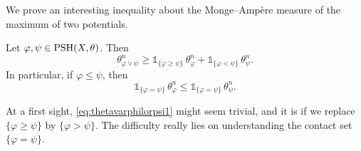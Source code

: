 We prove an interesting inequality about the Monge--Ampère measure of the maximum of two potentials.
\begin{lemma}\label{lma:lorMAineqe}
    Let $\varphi,\psi\in \mathrm{PSH}(X,\theta)$. Then
    \begin{equation}\label{eq:thetavarphilorpsi1}
    \theta_{\varphi\lor \psi}^n\geq \mathds{1}_{\{\varphi\geq \psi\}}\,\theta_{\varphi}^n+\mathds{1}_{\{\varphi<\psi\}}\,\theta_{\psi}^n.
    \end{equation}
    In particular, if $\varphi\leq \psi$, then
    \[
    \mathds{1}_{\{\varphi=\psi\}}\,\theta_{\varphi}^n\leq \mathds{1}_{\{\varphi=\psi\}}\,\theta_{\psi}^n.
    \]
\end{lemma}
At a first sight, \eqref{eq:thetavarphilorpsi1} might seem trivial, and it is if we replace $\{\varphi\geq \psi\}$ by $\{\varphi>\psi\}$. The difficulty really lies on understanding the contact set $\{\varphi=\psi\}$.

